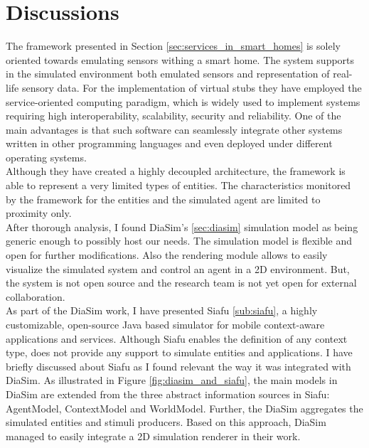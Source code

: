 \section{Discussions}\label{sec:discussions}

The framework presented in Section \ref{sec:services_in_smart_homes} is solely oriented towards emulating sensors withing a smart home. The system supports in the simulated environment both emulated sensors and representation of real-life sensory data. For the implementation of virtual stubs they have employed the service-oriented computing paradigm, which is widely used to implement systems requiring high interoperability, scalability, security and reliability. One of the main advantages is that such software can seamlessly integrate other systems written in other programming languages and even deployed under different operating systems.\\

Although they have created a highly decoupled architecture, the framework is able to represent a very limited types of entities. The characteristics monitored by the framework for the entities and the simulated agent are limited to proximity only.\\

After thorough analysis, I found DiaSim's \ref{sec:diasim} simulation model as being generic enough to possibly host our needs. The simulation model is flexible and open for further modifications. Also the rendering module allows to easily visualize the simulated system and control an agent in a 2D environment. But, the system is not open source and the research team is not yet open for external collaboration.\\

As part of the DiaSim work, I have presented Siafu \ref{sub:siafu}, a highly customizable, open-source Java based simulator for mobile context-aware applications and services. Although Siafu enables the definition of any context type, does not provide any support to simulate entities and applications. I have briefly discussed about Siafu as I found relevant the way it was integrated with DiaSim. As illustrated in Figure \ref{fig:diasim_and_siafu}, the main models in DiaSim are extended from the three abstract information sources in Siafu: AgentModel, ContextModel and WorldModel. Further, the DiaSim aggregates the simulated entities and stimuli producers. Based on this approach, DiaSim managed to easily integrate a 2D simulation renderer in their work.

